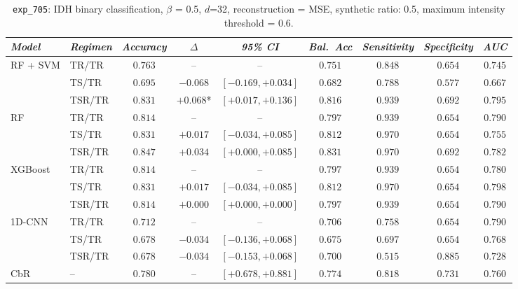 \begin{table}[H]
\centering
\scriptsize

\label{tab:ctrl_exp_705}
\begin{tabular*}{\textwidth}{@{\extracolsep{\fill}}llccccccc}
\toprule
\emph{Model} & \emph{Regimen} & \emph{Accuracy} & \emph{$\Delta$} & \emph{95\% CI} & \emph{Bal.\ Acc} & \emph{Sensitivity} & \emph{Specificity} & \emph{AUC}\\
\midrule
\multirow{3}{*}{RF + SVM} & TR/TR & $0.763$ & -- & -- & $0.751$ & $0.848$ & $0.654$ & $0.745$\\
 & TS/TR & $0.695$ & $-0.068$ & $[-0.169, +0.034]$ & $0.682$ & $0.788$ & $0.577$ & $0.667$\\
 & TSR/TR & $0.831$ & $+0.068$* & $[+0.017, +0.136]$ & $0.816$ & $0.939$ & $0.692$ & $0.795$\\
\midrule
\multirow{3}{*}{RF} & TR/TR & $0.814$ & -- & -- & $0.797$ & $0.939$ & $0.654$ & $0.790$\\
 & TS/TR & $0.831$ & $+0.017$ & $[-0.034, +0.085]$ & $0.812$ & $0.970$ & $0.654$ & $0.755$\\
 & TSR/TR & $0.847$ & $+0.034$ & $[+0.000, +0.085]$ & $0.831$ & $0.970$ & $0.692$ & $0.782$\\
\midrule
\multirow{3}{*}{XGBoost} & TR/TR & $0.814$ & -- & -- & $0.797$ & $0.939$ & $0.654$ & $0.780$\\
 & TS/TR & $0.831$ & $+0.017$ & $[-0.034, +0.085]$ & $0.812$ & $0.970$ & $0.654$ & $0.798$\\
 & TSR/TR & $0.814$ & $+0.000$ & $[+0.000, +0.000]$ & $0.797$ & $0.939$ & $0.654$ & $0.790$\\
\midrule
\multirow{3}{*}{1D-CNN} & TR/TR & $0.712$ & -- & -- & $0.706$ & $0.758$ & $0.654$ & $0.790$\\
 & TS/TR & $0.678$ & $-0.034$ & $[-0.136, +0.068]$ & $0.675$ & $0.697$ & $0.654$ & $0.768$\\
 & TSR/TR & $0.678$ & $-0.034$ & $[-0.153, +0.068]$ & $0.700$ & $0.515$ & $0.885$ & $0.728$\\
\midrule
CbR & -- & $0.780$ & -- & $[+0.678, +0.881]$ & $0.774$ & $0.818$ & $0.731$ & $0.760$\\
\bottomrule
\end{tabular*}
\caption{\small \texttt{exp\_705}: IDH binary classification, $\beta$ = 0.5, $d$=32, reconstruction = MSE, synthetic ratio: 0.5, maximum intensity threshold = 0.6.}
\end{table}

